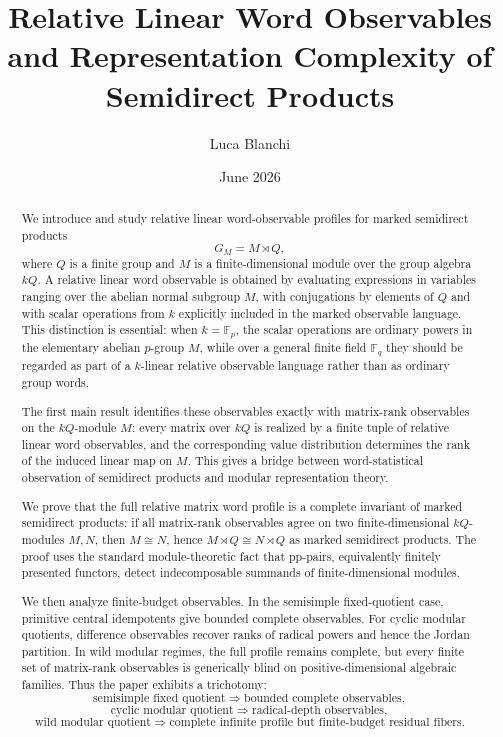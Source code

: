 \documentclass[11pt]{article}
\title{Relative Linear Word Observables and Representation Complexity of Semidirect Products}
\author{Luca Blanchi}
\date{June 2026}
\begin{document}
\maketitle

\begin{abstract}
We introduce and study relative linear word-observable profiles for marked semidirect products
\[
G_M=M\rtimes Q,
\]
where $Q$ is a finite group and $M$ is a finite-dimensional module over the group algebra $kQ$. A relative linear word observable is obtained by evaluating expressions in variables ranging over the abelian normal subgroup $M$, with conjugations by elements of $Q$ and with scalar operations from $k$ explicitly included in the marked observable language. This distinction is essential: when $k=\mathbb F_p$, the scalar operations are ordinary powers in the elementary abelian $p$-group $M$, while over a general finite field $\mathbb F_q$ they should be regarded as part of a $k$-linear relative observable language rather than as ordinary group words.

The first main result identifies these observables exactly with matrix-rank observables on the $kQ$-module $M$: every matrix over $kQ$ is realized by a finite tuple of relative linear word observables, and the corresponding value distribution determines the rank of the induced linear map on $M$. This gives a bridge between word-statistical observation of semidirect products and modular representation theory.

We prove that the full relative matrix word profile is a complete invariant of marked semidirect products: if all matrix-rank observables agree on two finite-dimensional $kQ$-modules $M,N$, then $M\cong N$, hence $M\rtimes Q\cong N\rtimes Q$ as marked semidirect products. The proof uses the standard module-theoretic fact that pp-pairs, equivalently finitely presented functors, detect indecomposable summands of finite-dimensional modules.

We then analyze finite-budget observables. In the semisimple fixed-quotient case, primitive central idempotents give bounded complete observables. For cyclic modular quotients, difference observables recover ranks of radical powers and hence the Jordan partition. In wild modular regimes, the full profile remains complete, but every finite set of matrix-rank observables is generically blind on positive-dimensional algebraic families. Thus the paper exhibits a trichotomy:
\[
\text{semisimple fixed quotient}\Rightarrow\text{bounded complete observables},
\]
\[
\text{cyclic modular quotient}\Rightarrow\text{radical-depth observables},
\]
\[
\text{wild modular quotient}\Rightarrow\text{complete infinite profile but finite-budget residual fibers}.
\]
\end{abstract}
\end{document}
